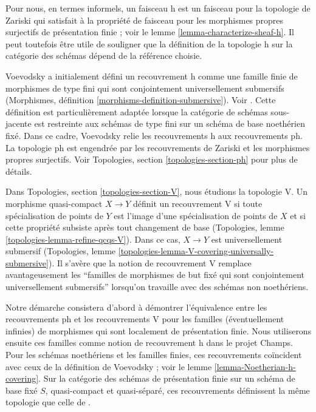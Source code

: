 \noindent
Pour nous, en termes informels, un faisceau h est un faisceau pour la topologie de Zariski
qui satisfait à la propriété de faisceau pour les morphismes propres surjectifs
de présentation finie ; voir le lemme \ref{lemma-characterize-sheaf-h}.
Il peut toutefois être utile de souligner que la définition de la topologie h
sur la catégorie des schémas dépend de la référence choisie.

\medskip\noindent
Voevodsky a initialement défini un
recouvrement h comme une famille finie de morphismes de type fini qui sont
conjointement universellement submersifs (Morphismes, définition
\ref{morphisms-definition-submersive}). Voir \cite[définition 3.1.2]{Voevodsky}.
Cette définition est particulièrement adaptée lorsque la catégorie de schémas sous-jacente est
restreinte aux schémas de type fini sur un schéma de base noethérien fixé.
Dans ce cadre, Voevodsky relie les recouvrements h aux recouvrements ph.
La topologie ph est engendrée par les recouvrements de Zariski et les morphismes propres
surjectifs. Voir Topologies, section \ref{topologies-section-ph}
pour plus de détails.

\medskip\noindent
Dans Topologies, section \ref{topologies-section-V}, nous étudions la topologie V.
Un morphisme quasi-compact $X \to Y$ définit un recouvrement V si toute spécialisation
de points de $Y$ est l'image d'une spécialisation de points de $X$
et si cette propriété subsiste après tout changement de base
(Topologies, lemme \ref{topologies-lemma-refine-qcqs-V}).
Dans ce cas, $X \to Y$ est universellement submersif
(Topologies, lemme \ref{topologies-lemma-V-covering-universally-submersive}).
Il s'avère que la notion de recouvrement V remplace avantageusement les
``familles de morphismes de but fixé qui sont
conjointement universellement submersifs'' lorsqu'on travaille avec des schémas non noethériens.

\medskip\noindent
Notre démarche consistera d'abord à démontrer l'équivalence entre les recouvrements ph et
les recouvrements V pour les familles (éventuellement infinies) de morphismes qui sont
localement de présentation finie. Nous utiliserons ensuite ces familles
comme notion de recouvrement h dans le projet Champs.
Pour les schémas noethériens et les familles finies, ces recouvrements
coïncident avec ceux de la définition de Voevodsky ; voir le
lemme \ref{lemma-Noetherian-h-covering}.
Sur la catégorie des schémas de présentation finie sur un schéma de base
fixé $S$, quasi-compact et quasi-séparé, ces recouvrements
définissent la même topologie que celle de \cite[définition 2.7]{Witt-Grass}.

